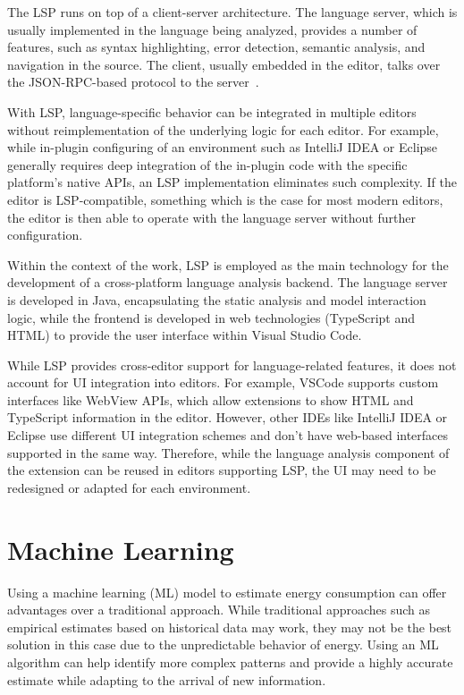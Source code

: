 The LSP runs on top of a client-server architecture. The language server, which is usually implemented in the language being analyzed, provides a number of features, such as syntax highlighting, error detection, semantic analysis, and navigation in the source. The client, usually embedded in the editor, talks over the JSON-RPC-based protocol to the server~\cite{lsp}.

With LSP, language-specific behavior can be integrated in multiple editors without reimplementation of the underlying logic for each editor. For example, while in-plugin configuring of an environment such as IntelliJ IDEA or Eclipse generally requires deep integration of the in-plugin code with the specific platform’s native APIs, an LSP implementation eliminates such complexity. If the editor is LSP-compatible, something which is the case for most modern editors, the editor is then able to operate with the language server without further configuration. 

Within the context of the work, LSP is employed as the main technology for the development of a cross-platform language analysis backend. The language server is developed in Java, encapsulating the static analysis and model interaction logic, while the frontend is developed in web technologies (TypeScript and HTML) to provide the user interface within Visual Studio Code. 

While LSP provides cross-editor support for language-related features, it does not account for UI integration into editors. For example, VSCode supports custom interfaces like WebView APIs, which allow extensions to show HTML and TypeScript information in the editor. However, other IDEs like IntelliJ IDEA or Eclipse use different UI integration schemes and don't have web-based interfaces supported in the same way. Therefore, while the language analysis component of the extension can be reused in editors supporting LSP, the UI may need to be redesigned or adapted for each environment.


\section{Machine Learning} \label{sec:background_machine_learning}

Using a machine learning (ML) model to estimate energy consumption can offer advantages over a traditional approach. While traditional approaches such as empirical estimates based on historical data may work, they may not be the best solution in this case due to the unpredictable behavior of energy. Using an ML algorithm can help identify more complex patterns and provide a highly accurate estimate while adapting to the arrival of new information.

